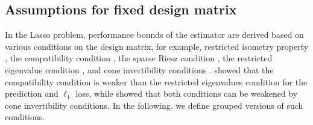 \documentclass[11pt,preprint]{imsart}
\numberwithin{equation}{section}
\theoremstyle{plain}
\theoremstyle{remark}
\theoremstyle{mystyle}
\begin{document}
\subsection{Assumptions for fixed design matrix}\label{subsec:designassump} In the Lasso problem, 
performance bounds of the estimator are derived based on various conditions on the design matrix, 
for example, restricted isometry property \citep{CandesT05}, 
the compatibility condition \citep{VDG07}, the sparse Riesz condition \citep{ZhangH08}, 
the restricted eigenvalue condition \citep{BRT09, Koltchinskii09}, 
and cone invertibility conditions \citep{YeZ10}. 
\cite{VDG09} showed that the compatibility condition is weaker than the restricted eigenvalues condition 
for the prediction and $\ell_1$ loss, 
while \cite{YeZ10} showed that both conditions can be weakened by cone invertibility conditions. 
In the following, we define grouped versions of such conditions. 
\end{document}
